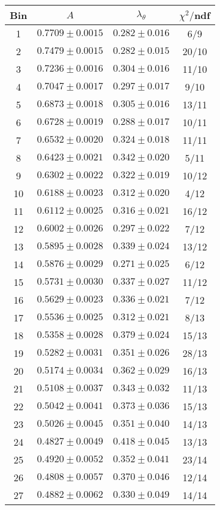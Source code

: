 \begin{tabular}{c|c|c|c}
Bin & $A$ & $\lambda_\theta$ & $\chi^2/$ndf \\
\hline
1 & $0.7709\pm0.0015$ & $0.282\pm0.016$ & 6/9 \\
2 & $0.7479\pm0.0015$ & $0.282\pm0.015$ & 20/10 \\
3 & $0.7236\pm0.0016$ & $0.304\pm0.016$ & 11/10 \\
4 & $0.7047\pm0.0017$ & $0.297\pm0.017$ & 9/10 \\
5 & $0.6873\pm0.0018$ & $0.305\pm0.016$ & 13/11 \\
6 & $0.6728\pm0.0019$ & $0.288\pm0.017$ & 10/11 \\
7 & $0.6532\pm0.0020$ & $0.324\pm0.018$ & 11/11 \\
8 & $0.6423\pm0.0021$ & $0.342\pm0.020$ & 5/11 \\
9 & $0.6302\pm0.0022$ & $0.322\pm0.019$ & 10/12 \\
10 & $0.6188\pm0.0023$ & $0.312\pm0.020$ & 4/12 \\
11 & $0.6112\pm0.0025$ & $0.316\pm0.021$ & 16/12 \\
12 & $0.6002\pm0.0026$ & $0.297\pm0.022$ & 7/12 \\
13 & $0.5895\pm0.0028$ & $0.339\pm0.024$ & 13/12 \\
14 & $0.5876\pm0.0029$ & $0.271\pm0.025$ & 6/12 \\
15 & $0.5731\pm0.0030$ & $0.337\pm0.027$ & 11/12 \\
16 & $0.5629\pm0.0023$ & $0.336\pm0.021$ & 7/12 \\
17 & $0.5536\pm0.0025$ & $0.312\pm0.021$ & 8/13 \\
18 & $0.5358\pm0.0028$ & $0.379\pm0.024$ & 15/13 \\
19 & $0.5282\pm0.0031$ & $0.351\pm0.026$ & 28/13 \\
20 & $0.5174\pm0.0034$ & $0.362\pm0.029$ & 16/13 \\
21 & $0.5108\pm0.0037$ & $0.343\pm0.032$ & 11/13 \\
22 & $0.5042\pm0.0041$ & $0.373\pm0.036$ & 15/13 \\
23 & $0.5026\pm0.0045$ & $0.351\pm0.040$ & 14/13 \\
24 & $0.4827\pm0.0049$ & $0.418\pm0.045$ & 13/13 \\
25 & $0.4920\pm0.0052$ & $0.352\pm0.041$ & 23/14 \\
26 & $0.4808\pm0.0057$ & $0.370\pm0.046$ & 12/14 \\
27 & $0.4882\pm0.0062$ & $0.330\pm0.049$ & 14/14 \\

\end{tabular}
